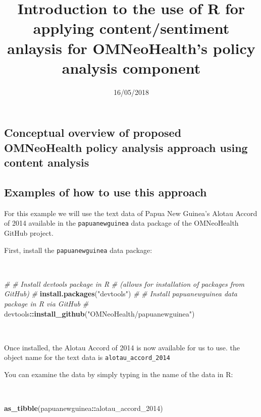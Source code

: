 \documentclass[11pt,a4paper]{article}
\title{Introduction to the use of R for applying content/sentiment anlaysis for
OMNeoHealth's policy analysis component}
\author{}
\date{16/05/2018}
\newenvironment{Shaded}{\begin{snugshade}}{\end{snugshade}}
\newcommand{\KeywordTok}[1]{\textcolor[rgb]{0.13,0.29,0.53}{\textbf{#1}}}
\newcommand{\DecValTok}[1]{\textcolor[rgb]{0.00,0.00,0.81}{#1}}
\newcommand{\StringTok}[1]{\textcolor[rgb]{0.31,0.60,0.02}{#1}}
\newcommand{\CommentTok}[1]{\textcolor[rgb]{0.56,0.35,0.01}{\textit{#1}}}
\newcommand{\OperatorTok}[1]{\textcolor[rgb]{0.81,0.36,0.00}{\textbf{#1}}}
\newcommand{\NormalTok}[1]{#1}
\begin{document}
\maketitle

\hypertarget{conceptual-overview-of-proposed-omneohealth-policy-analysis-approach-using-content-analysis}{%
\subsection{Conceptual overview of proposed OMNeoHealth policy analysis
approach using content
analysis}\label{conceptual-overview-of-proposed-omneohealth-policy-analysis-approach-using-content-analysis}}

\hypertarget{examples-of-how-to-use-this-approach}{%
\subsection{Examples of how to use this
approach}\label{examples-of-how-to-use-this-approach}}

For this example we will use the text data of Papua New Guinea's Alotau
Accord of 2014 available in the \texttt{papuanewguinea} data package of
the OMNeoHealth GitHub project.

First, install the \texttt{papuanewguinea} data package:

~

\begin{Shaded}
\begin{Highlighting}[]
\CommentTok{#}
\CommentTok{# Install devtools package in R }
\CommentTok{# (allows for installation of packages from GitHub)}
\CommentTok{#}
\KeywordTok{install.packages}\NormalTok{(}\StringTok{"devtools"}\NormalTok{)}
\CommentTok{#}
\CommentTok{# Install papuanewguinea data package in R via GitHub}
\CommentTok{#}
\NormalTok{devtools}\OperatorTok{::}\KeywordTok{install_github}\NormalTok{(}\StringTok{"OMNeoHealth/papuanewguinea"}\NormalTok{)}
\end{Highlighting}
\end{Shaded}

~

Once installed, the Alotau Accord of 2014 is now available for us to
use. the object name for the text data is \texttt{alotau\_accord\_2014}

You can examine the data by simply typing in the name of the data in R:

~

\begin{Shaded}
\begin{Highlighting}[]
\KeywordTok{as_tibble}\NormalTok{(papuanewguinea}\OperatorTok{::}\NormalTok{alotau_accord_}\DecValTok{2014}\NormalTok{)}
\end{Highlighting}
\end{Shaded}
\end{document}
